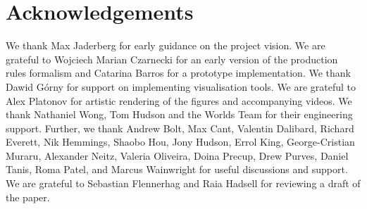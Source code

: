 \documentclass[11pt, a4paper, logo, copyright]{deepmind}
\begin{document}
\section{Acknowledgements}
We thank Max Jaderberg for early guidance on the project vision. We are grateful to Wojciech Marian Czarnecki for an early version of the production rules formalism and Catarina Barros for a prototype implementation. We thank Dawid G\'orny for support on implementing visualisation tools. We are grateful to Alex Platonov for artistic rendering of the figures and accompanying videos. We thank Nathaniel Wong, Tom Hudson and the Worlds Team for their engineering support. Further, we thank Andrew Bolt, Max Cant, Valentin Dalibard, Richard Everett, Nik Hemmings, Shaobo Hou, Jony Hudson, Errol King, George-Cristian Muraru, Alexander Neitz, Valeria Oliveira, Doina Precup, Drew Purves, Daniel Tanis, Roma Patel, and Marcus Wainwright for useful discussions and support. We are grateful to Sebastian Flennerhag and Raia Hadsell for reviewing a draft of the paper.

\newpage
\end{document}

